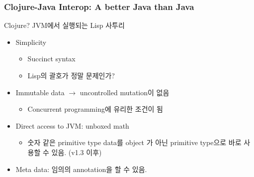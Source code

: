 \begin{frame}
\frametitle{Clojure-Java Interop: A better Java than Java}

Clojure? JVM에서 실행되는 Lisp 사투리

\begin{itemize}
\item Simplicity
  \begin{itemize}
  \item Succinct syntax
  \item Lisp의 괄호가 정말 문제인가?
  \end{itemize}

\item Immutable data $\rightarrow$ uncontrolled mutation이 없음
  \begin{itemize}
  \item Concurrent programming에 유리한 조건이 됨
  \end{itemize}

\item Direct access to JVM: unboxed math
  \begin{itemize}
  \item 숫자 같은 primitive type data를 object 가 아닌 primitive
    type으로 바로 사용할 수 있음. (v1.3 이후)
  \end{itemize}

\item Meta data: 임의의 annotation을 할 수 있음.
\end{itemize}


\end{frame}
